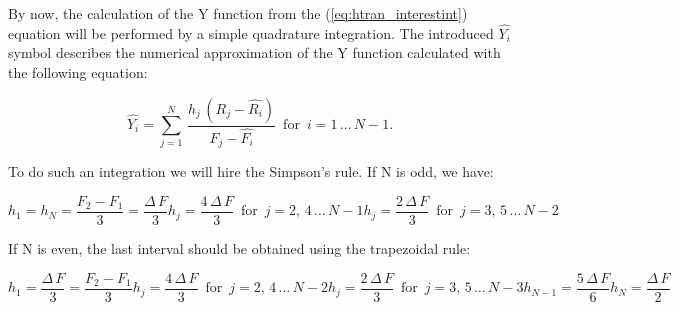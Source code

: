 \documentclass[12pt,twoside,a4paper]{article}
\numberwithin{equation}{subsection}
\numberwithin{figure}{subsection}
\begin{document}
By now, the calculation of the $\mathrm{Y}$ function from the (\ref{eq:htran_interestint}) equation will be performed by a simple
quadrature integration. The introduced $\widehat{Y_{i}}$ symbol describes the numerical approximation of the $\mathrm{Y}$ function
calculated with the following equation:

\begin{equation} \label{eq:htran_simplequadrature}
  \widehat{Y_{i}}=\sum_{j=1}^{N}\,\frac {{h_{j}}\,({R_{j}} - \widehat{R_{i}})}{{F_{j}} - \widehat{F_{i}}} \,\mbox{ for } \, i =
  1\,\ldots\,{N - 1} .
\end{equation}

To do such an integration we will hire the Simpson's rule. If N is odd, we have:

\begin{subequations} \label{eq:htran_nodd}
  \begin{equation}   \label{eq:hnodd_fnlast}
    {h_{1}} = {h_{N}} = \frac {F_2 - F_1}{3} = \frac {\Delta \,F}{3}
  \end{equation}
  \begin{equation}   \label{eq:hnodd_even}
    {h_{j}} = \frac {4\,\Delta \,F}{3}  \,\mbox{ for } \,j=2, \,4\,\ldots\,{N - 1}
  \end{equation}
  \begin{equation}   \label{eq:hnodd_odd}
    {h_{j}} = \frac {2\,\Delta \,F}{3}  \,\mbox{ for } \,j=3, \,5\,\ldots\,{N - 2}
  \end{equation}
\end{subequations}

If N is even, the last interval should be obtained using the trapezoidal rule:

\begin{subequations} \label{eq:htran_neven}
  \begin{equation}   \label{eq:hneven_first}
    {h_{1}} = \frac {\Delta \,F}{3} = \frac {F_2 - F_1}{3}
  \end{equation}
  \begin{equation}   \label{eq:hneven_even}
    {h_{j}}=\frac {4\,\Delta \,F}{3}  \,\mbox{ for } \,j=2, \,4\,\ldots\,{N - 2}
  \end{equation}
  \begin{equation}   \label{eq:hneven_odd}
    {h_{j}}=\frac {2\,\Delta \,F}{3}  \,\mbox{ for } \,j=3, \,5\,\ldots\,{N - 3}
  \end{equation}
   \begin{equation}   \label{eq:hneven_prelast}
    {h_{N - 1}} = \frac {5\,\Delta \,F}{6}
  \end{equation}
   \begin{equation}   \label{eq:hneven_last}
    {h_{N}} = \frac {\Delta \,F}{2}
  \end{equation}
\end{subequations}
\end{document}
